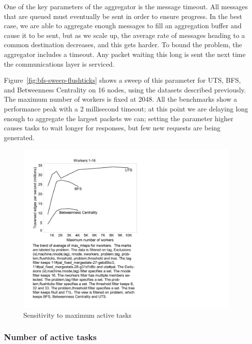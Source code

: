 {One of the key parameters of the aggregator is the message
timeout. All messages that are queued must eventually be sent in order
to ensure progress. In the best case, we are able to aggregate enough
messages to fill an aggregation buffer and cause it to be sent, but as
we scale up, the average rate of messages heading to a common
destination decreases, and this gets harder. To bound the problem, the
aggregator includes a timeout. Any packet waiting this long is sent
the next time the communications layer is serviced.

Figure~\ref{fig:bfs-sweep-flushticks} shows a sweep of this parameter
for UTS, BFS, and Betweenness Centrality on 16 nodes, using the
datasets described previously. The maximum number of workers is fixed
at 2048. All the benchmarks show a performance peak with a 2
millisecond timeout; at this point we are delaying long enough to
aggregate the largest packets we can; setting the parameter higher
causes tasks to wait longer for responses, but few new requests are
being generated.


\begin{figure}[htb]
\begin{center}
  \includegraphics[width=0.95\columnwidth]{figs/worker_sweep}
\begin{minipage}{0.95\columnwidth} 
  \caption{\label{fig:bfs-sweep-workers} Sensitivity to maximum active tasks}
\end{minipage}
\vspace{-3ex}
\end{center}
\end{figure}

\subsubsection{Number of active tasks} 

}
